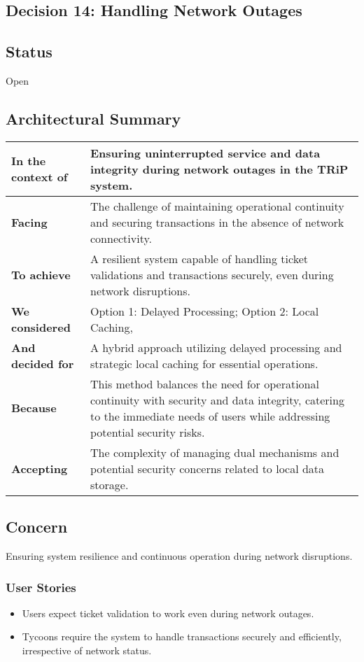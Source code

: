 \subsection{Decision 14: Handling Network Outages}

\subsection*{Status}
Open

\subsection*{Architectural Summary}
\begin{tabular}{|p{3.5cm}|p{10.5cm}|}
    \hline
    \textbf{In the context of} & Ensuring uninterrupted service and data integrity during network outages in the TRiP system. \\
    \hline
    \textbf{Facing} & The challenge of maintaining operational continuity and securing transactions in the absence of network connectivity. \\
    \hline
    \textbf{To achieve} & A resilient system capable of handling ticket validations and transactions securely, even during network disruptions. \\
    \hline
    \textbf{We considered} & Option 1: Delayed Processing; Option 2: Local Caching, \\
    \hline
    \textbf{And decided for} & A hybrid approach utilizing delayed processing and strategic local caching for essential operations. \\
    \hline
    \textbf{Because} & This method balances the need for operational continuity with security and data integrity, catering to the immediate needs of users while addressing potential security risks. \\
    \hline
    \textbf{Accepting} & The complexity of managing dual mechanisms and potential security concerns related to local data storage. \\
    \hline
\end{tabular}

\subsection*{Concern}
Ensuring system resilience and continuous operation during network disruptions.
\subsubsection*{User Stories}
\begin{itemize}
    \item Users expect ticket validation to work even during network outages.
    \item Tycoons require the system to handle transactions securely and efficiently, irrespective of network status.
\end{itemize}

